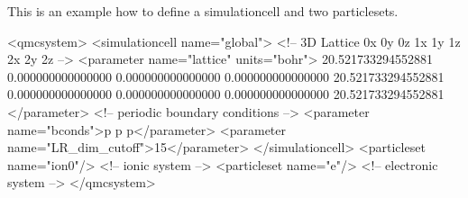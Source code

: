 This is an example how to define a {\ttfamily simulationcell} and two {\ttfamily particleset}s. 
\begin{DoxyCode}
<qmcsystem>
  <simulationcell name=\textcolor{stringliteral}{"global"}>
    <!-- 3D Lattice 0x 0y 0z 1x 1y 1z 2x 2y 2z -->
    <parameter name=\textcolor{stringliteral}{"lattice"} units=\textcolor{stringliteral}{"bohr"}> 
    20.521733294552881    0.000000000000000    0.000000000000000
     0.000000000000000   20.521733294552881    0.000000000000000
     0.000000000000000    0.000000000000000   20.521733294552881
    </parameter>
    <!-- periodic boundary conditions -->
    <parameter name=\textcolor{stringliteral}{"bconds"}>p p p</parameter> 
    <parameter name=\textcolor{stringliteral}{"LR\_dim\_cutoff"}>15</parameter> 
  </simulationcell>
  <particleset name=\textcolor{stringliteral}{"ion0"}/> <!-- ionic system -->
  <particleset name=\textcolor{stringliteral}{"e"}/>    <!-- electronic system -->
</qmcsystem>
\end{DoxyCode}


